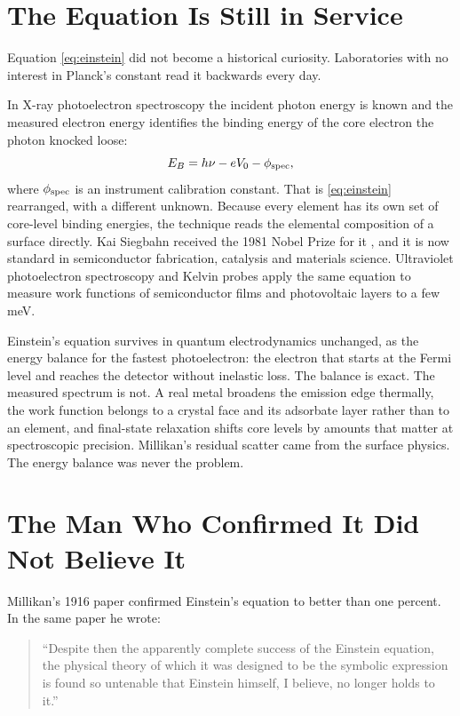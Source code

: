 \documentclass[11pt]{article}
\begin{document}
\section{The Equation Is Still in Service}

Equation \eqref{eq:einstein} did not become a historical curiosity.
Laboratories with no interest in Planck's constant read it backwards every
day.

In X-ray photoelectron spectroscopy the incident photon energy is known and
the measured electron energy identifies the binding energy of the core
electron the photon knocked loose:
\begin{equation}\label{eq:xps}
  E_B = h\nu - eV_0 - \phi_{\rm spec},
\end{equation}
where $\phi_{\rm spec}$ is an instrument calibration constant.  That is
\eqref{eq:einstein} rearranged, with a different unknown.  Because every
element has its own set of core-level binding energies, the technique reads
the elemental composition of a surface directly.  Kai Siegbahn received the
1981 Nobel Prize for it \citep{Siegbahn1967}, and it is now standard in
semiconductor fabrication, catalysis and materials science.  Ultraviolet
photoelectron spectroscopy and Kelvin probes apply the same equation to
measure work functions of semiconductor films and photovoltaic layers to a few
meV.

Einstein's equation survives in quantum electrodynamics unchanged, as the
energy balance for the fastest photoelectron: the electron that starts at the
Fermi level and reaches the detector without inelastic loss.  The balance is exact.  The measured
spectrum is not.  A real metal broadens the emission
edge thermally, the work function belongs to a crystal face and its adsorbate
layer rather than to an element, and final-state relaxation shifts core levels
by amounts that matter at spectroscopic precision.  Millikan's residual
scatter came from the surface physics.  The energy balance was never the
problem.

\section{The Man Who Confirmed It Did Not Believe It}

Millikan's 1916 paper confirmed Einstein's equation to better than one
percent.  In the same paper he wrote:
\begin{quote}
  ``Despite then the apparently complete success of the Einstein equation, the
  physical theory of which it was designed to be the symbolic expression is
  found so untenable that Einstein himself, I believe, no longer holds to
  it.'' \citep[p.\ 388]{Millikan1916}
\end{quote}
\end{document}
